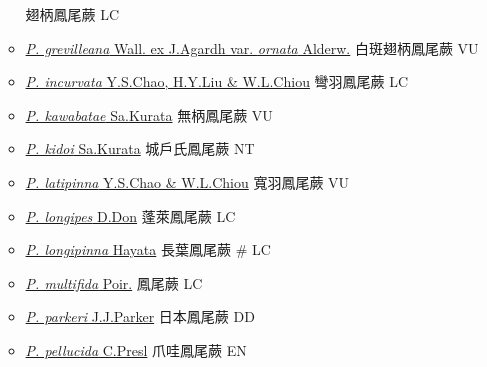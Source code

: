 \begin{itemize}
\begin{itemize}
                                        翅柄鳳尾蕨   LC
        \item[] \href{http://www.theplantlist.org/tpl1.1/search?q=Pteris+grevilleana+var.+ornata}{\textit{P. grevilleana} Wall. ex J.Agardh var. \textit{ornata} Alderw.}  
                                        白斑翅柄鳳尾蕨   VU
        \item[] \href{http://www.theplantlist.org/tpl1.1/search?q=Pteris+incurvata}{\textit{P. incurvata} Y.S.Chao, H.Y.Liu \& W.L.Chiou}   彎羽鳳尾蕨   LC
        \item[] \href{http://www.theplantlist.org/tpl1.1/search?q=Pteris+kawabatae}{\textit{P. kawabatae} Sa.Kurata}   無柄鳳尾蕨   VU
        \item[] \href{http://www.theplantlist.org/tpl1.1/search?q=Pteris+kidoi}{\textit{P. kidoi} Sa.Kurata}   城戶氏鳳尾蕨   NT
        \item[] \href{http://www.theplantlist.org/tpl1.1/search?q=Pteris+latipinna}{\textit{P. latipinna} Y.S.Chao \& W.L.Chiou}   寬羽鳳尾蕨   VU
        \item[] \href{http://www.theplantlist.org/tpl1.1/search?q=Pteris+longipes}{\textit{P. longipes} D.Don}   蓬萊鳳尾蕨   LC
        \item[] \href{http://www.theplantlist.org/tpl1.1/search?q=Pteris+longipinna}{\textit{P. longipinna} Hayata}   長葉鳳尾蕨  \# LC
        \item[] \href{http://www.theplantlist.org/tpl1.1/search?q=Pteris+multifida}{\textit{P. multifida} Poir.}   鳳尾蕨   LC
        \item[] \href{http://www.theplantlist.org/tpl1.1/search?q=Pteris+parkeri}{\textit{P. parkeri} J.J.Parker}   日本鳳尾蕨   DD
        \item[] \href{http://www.theplantlist.org/tpl1.1/search?q=Pteris+pellucida}{\textit{P. pellucida} C.Presl}   爪哇鳳尾蕨   EN

\end{itemize}
\end{itemize}

